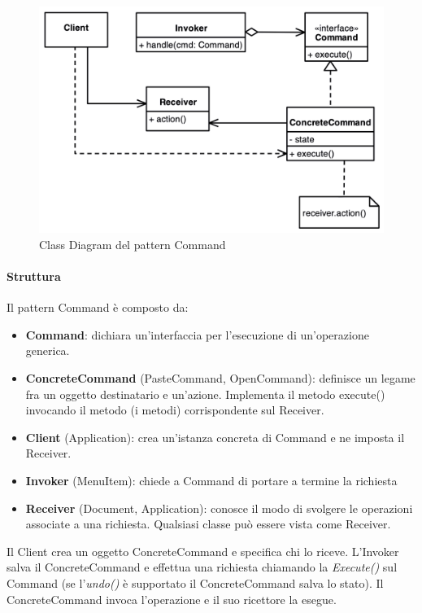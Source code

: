 \begin{figure}[H]
    \centering
    \includegraphics[width=0.75\linewidth]{assets/pattern/command/command-struttura.png}
    \caption{Class Diagram del pattern Command}
\end{figure}

\paragraph{Struttura} Il pattern Command è composto da:
\begin{itemize}
    \item \textbf{Command}: dichiara un’interfaccia per l’esecuzione di un’operazione generica.
    \item \textbf{ConcreteCommand} (PasteCommand, OpenCommand): definisce un legame fra un oggetto destinatario e un’azione. Implementa il metodo execute() invocando il metodo (i metodi) corrispondente sul Receiver.
    \item \textbf{Client} (Application): crea un’istanza concreta di Command e ne imposta il Receiver.
    \item \textbf{Invoker} (MenuItem): chiede a Command di portare a termine la richiesta
    \item \textbf{Receiver} (Document, Application): conosce il modo di svolgere le operazioni associate a una richiesta. Qualsiasi classe può essere vista come Receiver.
\end{itemize}

Il Client crea un oggetto ConcreteCommand e specifica chi lo riceve. L'Invoker salva il ConcreteCommand e effettua una richiesta chiamando la \textit{Execute()} sul Command (se l'\textit{undo()} è supportato il ConcreteCommand salva lo stato). Il ConcreteCommand invoca l'operazione e il suo ricettore la esegue.

